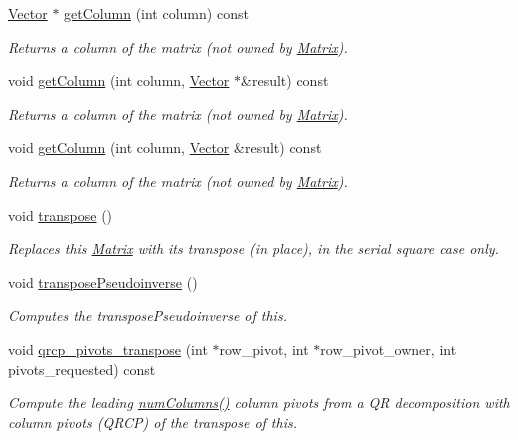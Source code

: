 \begin{DoxyCompactItemize}
\hyperlink{class_c_a_r_o_m_1_1_vector}{Vector} $\ast$ \hyperlink{class_c_a_r_o_m_1_1_matrix_ad293fe4af27e17f0a3f5fbda6a3e887f}{get\-Column} (int column) const 
\begin{DoxyCompactList}\small\item\em Returns a column of the matrix (not owned by \hyperlink{class_c_a_r_o_m_1_1_matrix}{Matrix}). \end{DoxyCompactList}\item 
void \hyperlink{class_c_a_r_o_m_1_1_matrix_a135b1fc98df48adbe7bd6f389742bf7e}{get\-Column} (int column, \hyperlink{class_c_a_r_o_m_1_1_vector}{Vector} $\ast$\&result) const 
\begin{DoxyCompactList}\small\item\em Returns a column of the matrix (not owned by \hyperlink{class_c_a_r_o_m_1_1_matrix}{Matrix}). \end{DoxyCompactList}\item 
void \hyperlink{class_c_a_r_o_m_1_1_matrix_af925d9f3e5e5ad2141179a435df463f9}{get\-Column} (int column, \hyperlink{class_c_a_r_o_m_1_1_vector}{Vector} \&result) const 
\begin{DoxyCompactList}\small\item\em Returns a column of the matrix (not owned by \hyperlink{class_c_a_r_o_m_1_1_matrix}{Matrix}). \end{DoxyCompactList}\item 
void \hyperlink{class_c_a_r_o_m_1_1_matrix_ae3b84c8b1748711319d55bfc086b6f82}{transpose} ()
\begin{DoxyCompactList}\small\item\em Replaces this \hyperlink{class_c_a_r_o_m_1_1_matrix}{Matrix} with its transpose (in place), in the serial square case only. \end{DoxyCompactList}\item 
void \hyperlink{class_c_a_r_o_m_1_1_matrix_a230332a19a32f07abc0d2645c743d009}{transpose\-Pseudoinverse} ()
\begin{DoxyCompactList}\small\item\em Computes the transpose\-Pseudoinverse of this. \end{DoxyCompactList}\item 
void \hyperlink{class_c_a_r_o_m_1_1_matrix_a28a98f195ceee36abc0e652b05ad6c33}{qrcp\-\_\-pivots\-\_\-transpose} (int $\ast$row\-\_\-pivot, int $\ast$row\-\_\-pivot\-\_\-owner, int pivots\-\_\-requested) const 
\begin{DoxyCompactList}\small\item\em Compute the leading \hyperlink{class_c_a_r_o_m_1_1_matrix_ac0fae4db551542e9a5cdc401a38fe39f}{num\-Columns()} column pivots from a Q\-R decomposition with column pivots (Q\-R\-C\-P) of the transpose of this. \end{DoxyCompactList}\item 

\end{DoxyCompactItemize}
